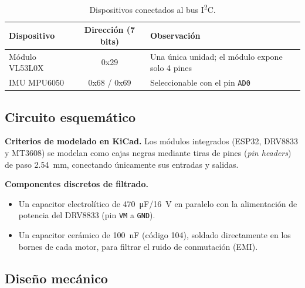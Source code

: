 \begin{table}[H]
\centering
\caption{Dispositivos conectados al bus I\textsuperscript{2}C.}
\label{tab:i2c}
\small
\begin{tabular}{L{3.8cm}cL{5.6cm}}
\toprule
Dispositivo & Dirección (7 bits) & Observación \\
\midrule
Módulo VL53L0X & 0x29 & Una única unidad; el módulo expone solo 4 pines \\
IMU MPU6050 & 0x68 / 0x69 & Seleccionable con el pin \texttt{AD0} \\
\bottomrule
\end{tabular}
\end{table}

\subsection{Circuito esquemático}
\begin{visar}
\textbf{Criterios de modelado en KiCad.} Los módulos integrados (ESP32, DRV8833 y MT3608) se modelan como cajas negras mediante tiras de pines (\emph{pin headers}) de paso \SI{2,54}{mm}, conectando únicamente sus entradas y salidas.

\textbf{Componentes discretos de filtrado.}
\begin{itemize}[nosep]
  \item Un capacitor electrolítico de \SI{470}{\micro F}/\SI{16}{V} en paralelo con la alimentación de potencia del DRV8833 (pin \texttt{VM} a \texttt{GND}).
  \item Un capacitor cerámico de \SI{100}{nF} (código 104), soldado directamente en los bornes de cada motor, para filtrar el ruido de conmutación (EMI).
\end{itemize}
\end{visar}

\subsection{Diseño mecánico}\label{sec:mecanica}


